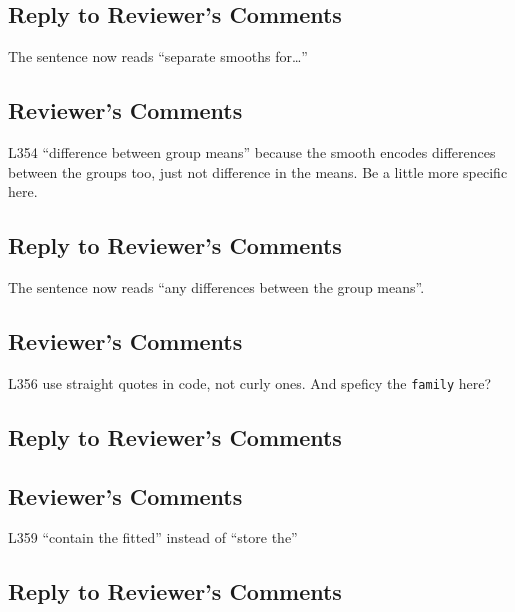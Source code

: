 \documentclass[
]{article}
\newcommand{\passthrough}[1]{#1}
\begin{document}
\hypertarget{section-23}{%
\subsection{\texorpdfstring{\textcolor{reviewersblue} {Reply to Reviewer's Comments}}{}}\label{section-23}}

The sentence now reads ``separate smooths for\ldots{}''

\hypertarget{reviewers-comments-23}{%
\subsection{Reviewer's Comments}\label{reviewers-comments-23}}

L354 ``difference between group means'' because the smooth encodes differences between the groups too, just not difference in the means. Be a little more specific here.

\hypertarget{section-24}{%
\subsection{\texorpdfstring{\textcolor{reviewersblue} {Reply to Reviewer's Comments}}{}}\label{section-24}}

The sentence now reads ``any differences between the group means''.

\hypertarget{reviewers-comments-24}{%
\subsection{Reviewer's Comments}\label{reviewers-comments-24}}

L356 use straight quotes in code, not curly ones. And speficy the \passthrough{\lstinline!family!} here?

\hypertarget{section-25}{%
\subsection{\texorpdfstring{\textcolor{reviewersblue} {Reply to Reviewer's Comments}}{}}\label{section-25}}

\hypertarget{reviewers-comments-25}{%
\subsection{Reviewer's Comments}\label{reviewers-comments-25}}

L359 ``contain the fitted'' instead of ``store the''

\hypertarget{section-26}{%
\subsection{\texorpdfstring{\textcolor{reviewersblue} {Reply to Reviewer's Comments}}{}}\label{section-26}}
\end{document}
